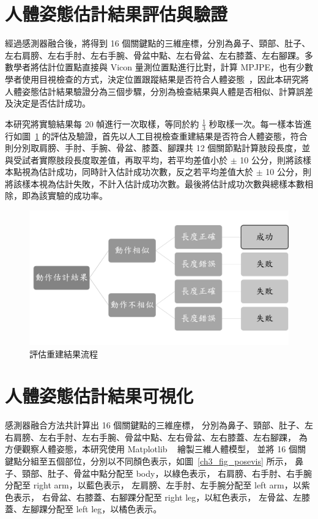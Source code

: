 \section{人體姿態估計結果評估與驗證}
經過感測器融合後，將得到 16 個關鍵點的三維座標，分別為鼻子、頸部、肚子、左右肩膀、左右手肘、左右手腕、骨盆中點、左右骨盆、左右膝蓋、左右腳踝。多數學者將估計位置點直接與 Vicon 量測位置點進行比對，計算 MPJPE，也有少數學者使用目視檢查的方式，決定位置跟蹤結果是否符合人體姿態~\cite{nakano2020evaluation}，因此本研究將人體姿態估計結果驗證分為三個步驟，分別為檢查結果與人體是否相似、計算誤差及決定是否估計成功。

本研究將實驗結果每 20 幀進行一次取樣，等同於約 $\frac{1}{3}$ 秒取樣一次。每一樣本皆進行如圖~\ref{ch3_fig_est_flow} 的評估及驗證，首先以人工目視檢查重建結果是否符合人體姿態，符合則分別取肩膀、手肘、手腕、骨盆、膝蓋、腳踝共 12 個關節點計算肢段長度，並與受試者實際肢段長度取差值，再取平均，若平均差值小於 $\pm$ 10 公分，則將該樣本點視為估計成功，同時計入估計成功次數，反之若平均差值大於 $\pm$ 10 公分，則將該樣本視為估計失敗，不計入估計成功次數。最後將估計成功次數與總樣本數相除，即為該實驗的成功率。

\begin{figure}[!ht]
   \centering
   \includegraphics[width=\linewidth]{figure/ch3_fig_est_flow.png}
    \caption[評估重建結果流程]{評估重建結果流程}
    \label{ch3_fig_est_flow}
\end{figure}

\section{人體姿態估計結果可視化}
感測器融合方法共計算出 16 個關鍵點的三維座標，
分別為鼻子、頸部、肚子、左右肩膀、左右手肘、左右手腕、骨盆中點、左右骨盆、左右膝蓋、左右腳踝，
為方便觀察人體姿態，本研究使用 Matplotlib ~\cite{Hunter:2007} 繪製三維人體模型，
並將 16 個關鍵點分組至五個部位，分別以不同顏色表示，如圖~\ref{ch3_fig_posevis} 所示，
鼻子、頸部、肚子、骨盆中點分配至 body，以綠色表示，
右肩膀、右手肘、右手腕分配至 right arm，以藍色表示，
左肩膀、左手肘、左手腕分配至 left arm，以紫色表示，
右骨盆、右膝蓋、右腳踝分配至 right leg，以紅色表示，
左骨盆、左膝蓋、左腳踝分配至 left leg，以橘色表示。

